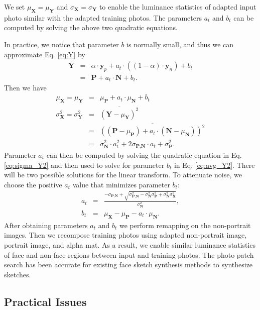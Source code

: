 \documentclass{article}
\def\avg{\overline}
\def\P{\textbf{P}}
\def\N{\textbf{N}}
\def\Y{\textbf{Y}}
\def\y{\textbf{y}}
\def\X{\textbf{X}}
\begin{document}
We set $\mu_{\X}=\mu_{\Y}$ and $\sigma_{\X}=\sigma_{\Y}$ to enable the luminance statistics of adapted input photo similar with the adapted training photos. The parameters $a_t$ and $b_t$ can be computed by solving the above two quadratic equations.

In practice, we notice that parameter $b$ is normally small, and thus we can approximate Eq. \eqref{eq:Y} by
\begin{eqnarray}\label{eq:Y2}
    \Y&=&\alpha\cdot \y_p + a_t \cdot \left((1-\alpha)\cdot \y_n\right) + b_t\nonumber\\
    &=&\P + a_t\cdot \N + b_t.
\end{eqnarray}
Then we have
\begin{eqnarray}
    \mu_{\X}=\mu_{\Y}&=&\mu_{\P} + a_t\cdot \mu_{\N} + b_t\label{eq:avg_Y2}\\
    \sigma_{\X}^2=\sigma_{\Y}^2&=&\avg{(\Y-\mu_{\Y})^2}\nonumber\\
    &=&\avg{\left((\P - \mu_{\P}) + a_t\cdot (\N-\mu_{\N})\right)^2 }\nonumber\\
    &=&\sigma_{\N}^2 \cdot a_t^2 + 2\sigma_{\P,\N} \cdot a_t + \sigma_{\P}^2.\label{eq:sigma_Y2}
\end{eqnarray}
Parameter $a_t$ can then be computed by solving the quadratic equation in Eq. \eqref{eq:sigma_Y2} and then used to solve for parameter $b_t$ in Eq. \eqref{eq:avg_Y2}. There will be two possible solutions for the linear transform. To attenuate noise, we choose the positive $a_t$ value that minimizes parameter $b_t$:
\begin{eqnarray}
    a_t&=& \frac{- \sigma_{\P,\N}+\sqrt{ \sigma_{\P,\N}^2- \sigma_{\N}^2 \sigma_{\P}^2+\sigma_{\N}^2\sigma_{\X}^2}}{\sigma_{\N}^2},\\
    b_t&=&\mu_{\X} - \mu_{\P} - a_t\cdot \mu_{\N}.
\end{eqnarray}
After obtaining parameters $a_t$ and $b_t$ we perform remapping on the non-portrait images. Then we recompose training photos using adapted non-portrait image, portrait image, and alpha mat. As a result, we enable similar luminance statistics of face and non-face regions between input and training photos. The photo patch search has been accurate for existing face sketch synthesis methods to synthesize sketches.

\subsection{Practical Issues}\label{sec:practicalconcern}
\end{document}
